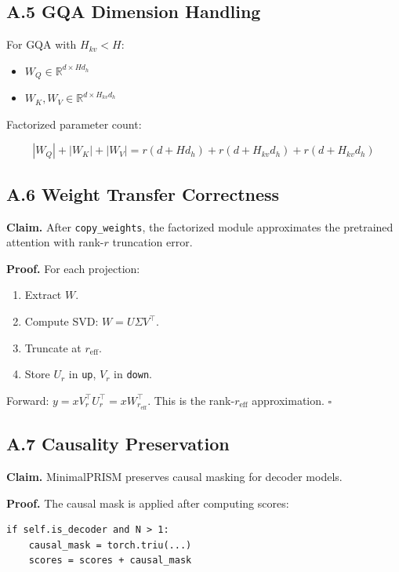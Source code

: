 \subsection{A.5 GQA Dimension Handling}

For GQA with $H_{kv} < H$:

\begin{itemize}
\item $W_Q \in \mathbb{R}^{d \times H d_h}$
\item $W_K, W_V \in \mathbb{R}^{d \times H_{kv} d_h}$

\end{itemize}
Factorized parameter count:

\[
|W_Q| + |W_K| + |W_V| = r(d + H d_h) + r(d + H_{kv} d_h) + r(d + H_{kv} d_h)
\tag{A.4}
\]

\subsection{A.6 Weight Transfer Correctness}

\textbf{Claim.} After \texttt{copy\_weights}, the factorized module approximates the 
pretrained attention with rank-$r$ truncation error.

\textbf{Proof.} For each projection:
\begin{enumerate}
\item Extract $W$.
\item Compute SVD: $W = U \Sigma V^\top$.
\item Truncate at $r_\text{eff}$.
\item Store $U_r$ in \texttt{up}, $V_r$ in \texttt{down}.

\end{enumerate}
Forward: $y = x V_r^\top U_r^\top = x W_{r_\text{eff}}^\top$. This is the 
rank-$r_\text{eff}$ approximation. $\square$

\subsection{A.7 Causality Preservation}

\textbf{Claim.} MinimalPRISM preserves causal masking for decoder models.

\textbf{Proof.} The causal mask is applied after computing scores:

\begin{lstlisting}
if self.is_decoder and N > 1:
    causal_mask = torch.triu(...)
    scores = scores + causal_mask
\end{lstlisting}


